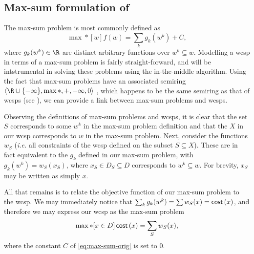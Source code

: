 \subsection{Max-sum formulation of }
The max-sum problem is most commonly defined as
\begin{equation}
	\label{eq:max-sum-orig}
	\max*[w] f(w) = \sum_k g_k(w^k) + C,
\end{equation}
where \(g_k(w^k) \in \R\) are distinct arbitrary functions over \(w^k \subseteq w\).
Modelling a \gls{wcsp} in terms of a max-sum problem is fairly straight-forward, and will be intstrumental in solving these problems using the in-the-middle algorithm.
Using the fact that max-sum problems have an associated semiring \(\langle\R\cup\{-\infty\},\max*,+,-\infty,0\rangle\) \parencite[\pno~3]{Werner07}, which happens to be the same semiring as that of \glspl{wcsp} (see ), we can provide a link between max-sum problems and \glspl{wcsp}.

Observing the definitions of max-sum problems and \glspl{wcsp}, it is clear that the set \(S\) corresponds to some \(w^k\) in the max-sum problem definition and that the \(X\) in our \gls{wcsp} corresponds to \(w\) in the max-sum problem.
Next, consider the functions \(w_S\) (\emph{i.e.} all constraints of the \gls{wcsp} defined on the subset \(S\subseteq X\)).
These are in fact equivalent to the \(g_k\) defined in our max-sum problem, with \(g_k(w^k) = w_S(x_S)\), where \(x_S \in D_S \subseteq D\) corresponds to \(w^k \subseteq w\).
For brevity, \(x_S\) may be written as simply \(x\).

All that remains is to relate the objective function of our max-sum problem to the \gls{wcsp}.
We may immediately notice that \(\sum_k g_k(w^k) = \sum w_S(x) = \operatorname{\mathsf{cost}}\left(x\right)\), and therefore we may express our \gls{wcsp} as the max-sum problem
\begin{equation}
	\label{eq:max-sum-wcsp}
	\max*[x\in D] \operatorname{\mathsf{cost}}\left(x\right) = \sum_S w_S(x),
\end{equation}
where the constant \(C\) of \eqref{eq:max-sum-orig} is set to \(0\).


